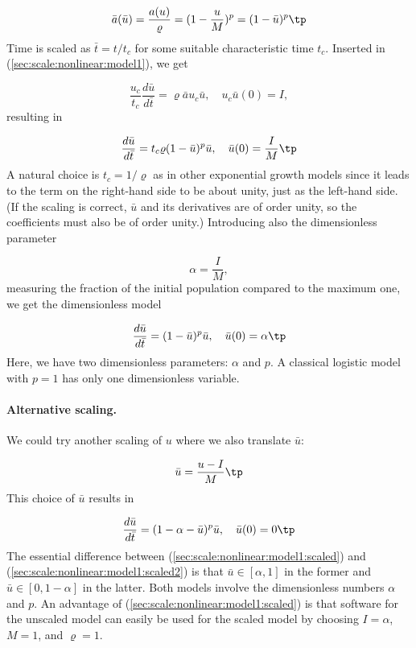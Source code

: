 \documentclass[graybox,envcountchap,sectrefs,final]{svmonodo}
\begin{document}
\[ \bar a(\bar u) = \frac{a(u)}{\varrho} = (1 - \frac{u}{M})^p =
(1 - \bar u)^p\tp\]
Time is scaled as $\bar t = t/t_c$ for some suitable characteristic time $t_c$.
Inserted in (\ref{sec:scale:nonlinear:model1}), we get

\[ \frac{u_c}{t_c}\frac{d\bar u}{d\bar t} = \varrho\bar a u_c\bar u,\quad u_c\bar u(0)=I,\]
resulting in

\[ \frac{d\bar u}{d\bar t} = t_c \varrho (1 - \bar u)^p \bar u,\quad
\bar u(0) =\frac{I}{M}\tp\]
A natural choice is $t_c =1/\varrho$ as in other exponential growth models
since it leads to the term on the right-hand side to be about unity,
just as the left-hand side. (If the scaling is correct, $\bar u$ and its
derivatives are of order unity, so the coefficients must also be of order
unity.) Introducing also the dimensionless parameter

\[ \alpha = \frac{I}{M},\]
measuring the fraction of the initial population compared to the maximum
one, we get the dimensionless model

\begin{equation}
\frac{d\bar u}{d\bar t} = (1 - \bar u)^p \bar u,\quad
\bar u(0) =\alpha\tp
\label{sec:scale:nonlinear:model1:scaled}
\end{equation}
Here, we have two dimensionless parameters: $\alpha$ and $p$. A classical
logistic model with $p=1$ has only one dimensionless variable.

\paragraph{Alternative scaling.}
We could try another scaling of $u$ where we also translate $\bar u$:

\[ \bar u = \frac{u-I}{M}\tp \]
This choice of $\bar u$ results in

\begin{equation}
\frac{d\bar u}{d\bar t} = (1 - \alpha - \bar u)^p \bar u,\quad
\bar u(0) =0\tp
\label{sec:scale:nonlinear:model1:scaled2}
\end{equation}
The essential difference between (\ref{sec:scale:nonlinear:model1:scaled})
and (\ref{sec:scale:nonlinear:model1:scaled2}) is that
$\bar u\in [\alpha, 1]$ in the former and $\bar u \in [0, 1-\alpha]$ in
the latter. Both models involve the dimensionless numbers $\alpha$ and $p$.
An advantage of (\ref{sec:scale:nonlinear:model1:scaled})
is that software for the unscaled model can easily be used for the
scaled model by choosing $I=\alpha$, $M=1$, and $\varrho=1$.
\end{document}
